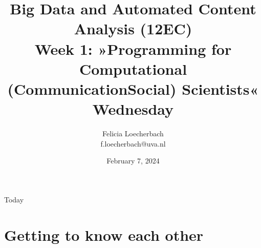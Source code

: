 \documentclass[compress]{beamer}
\begin{document}
\title[Big Data and Automated Content Analysis]{\textbf{Big Data and Automated Content Analysis (12EC)} 
\\Week 1: »Programming for Computational (Communication\textbar Social) Scientists«
\\Wednesday }
\author[Felicia Loecherbach]{Felicia Loecherbach\\ \footnotesize{f.loecherbach@uva.nl\\}}
\date{February 7, 2024}


\begin{frame}{}
	\titlepage
\end{frame}

\begin{frame}{Today}
	\tableofcontents
\end{frame}




\section{Getting to know each other}
\end{document}
